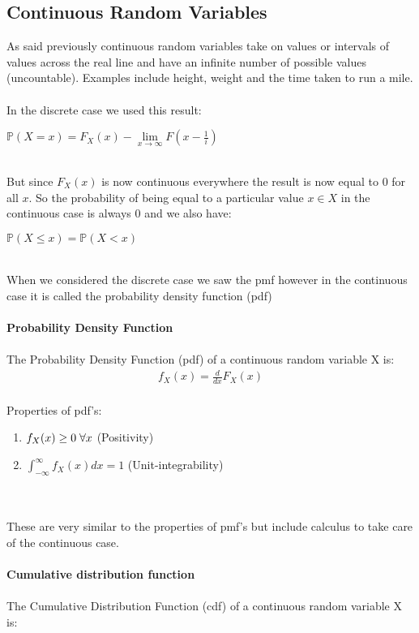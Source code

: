 \documentclass[,oneside]{article}
\begin{document}
\begin{enumerate}
\subsection{Continuous Random Variables}
As said previously continuous random variables take on values or intervals of values across the real line and have an infinite number of possible values (uncountable). Examples include height, weight and the time taken to run a mile. \\ \\
In the discrete case we used this result:
\begin{center}
$\mathbb{P}(X = x) = F_X(x)- \lim\limits_{x\to\infty} F(x-\frac{1}{i})$
\end{center}\\
But since $F_X(x)$ is now continuous everywhere the result is now equal to 0 for all $x$. So the probability of being equal to a particular value $x \in X$ in the continuous case is always 0 and we also have:
\begin{center}
$\mathbb{P}(X \leq x) = \mathbb{P}(X < x)$
\end{center}\\
When we considered the discrete case we saw the pmf however in the continuous case it is called the probability density function (pdf)\\ \\
\textbf{Probability Density Function}\\
\\The Probability Density Function (pdf) of a continuous random variable X is:
\begin{align*}
f_X(x)= \frac{d}{dx}F_X(x)
\end{align*}\\
Properties of pdf's:\\ 
\begin{enumerate}
\item $f_X(x) \geq 0 \hspace{0.1cm}\forall x$ (Positivity)
\item $\int_{-\infty }^{\infty } f_X(x)dx = 1$ (Unit-integrability)
\end{enumerate}\\ \\
These are very similar to the properties of pmf's but include calculus to take care of the continuous case.\\ \\
\textbf{Cumulative distribution function}\\
\\The Cumulative Distribution Function (cdf) of a continuous random variable X is:

\end{enumerate}
\end{document}
